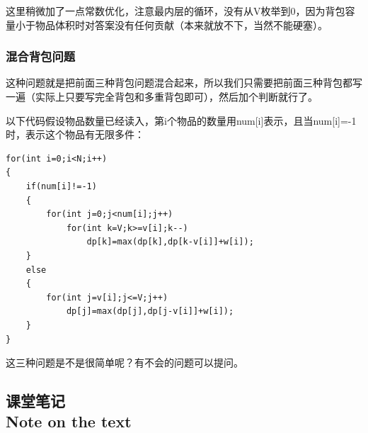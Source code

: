 \documentclass{article}
\theoremstyle{nonumberplain}
\newcommand{\note}{\ \par


	\subsection*{课堂笔记\\\tiny{Note on the text}}
	\newpage}
\begin{document}
这里稍微加了一点常数优化，注意最内层的循环，没有从V枚举到0，因为背包容量小于物品体积时对答案没有任何贡献（本来就放不下，当然不能硬塞）。

\subsubsection{混合背包问题}
这种问题就是把前面三种背包问题混合起来，所以我们只需要把前面三种背包都写一遍（实际上只要写完全背包和多重背包即可），然后加个判断就行了。

以下代码假设物品数量已经读入，第i个物品的数量用num[i]表示，且当num[i]=-1时，表示这个物品有无限多件：
\begin{verbatim}
for(int i=0;i<N;i++)
{
    if(num[i]!=-1)
    {
        for(int j=0;j<num[i];j++)
            for(int k=V;k>=v[i];k--) 
                dp[k]=max(dp[k],dp[k-v[i]]+w[i]);
	}
    else
    {
        for(int j=v[i];j<=V;j++)
            dp[j]=max(dp[j],dp[j-v[i]]+w[i]);
    }
}
\end{verbatim}

这三种问题是不是很简单呢？有不会的问题可以提问。
\note
\end{document}
